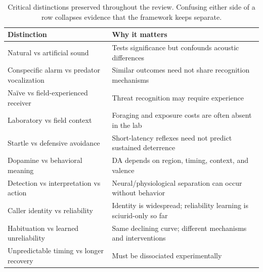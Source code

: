 \begin{table}[tbp]
\centering
\footnotesize
\singlespacing
\caption{Critical distinctions preserved throughout the review. Confusing either side of a row collapses evidence that the framework keeps separate.}
\label{tab:summary-distinctions}
\begin{tabular}{@{}p{2.0in}p{4.2in}@{}}
\toprule
\textbf{Distinction} & \textbf{Why it matters} \\
\midrule
Natural vs artificial sound & Tests significance but confounds acoustic differences \\
\addlinespace[2pt]
Conspecific alarm vs predator vocalization & Similar outcomes need not share recognition mechanisms \\
\addlinespace[2pt]
Na\"ive vs field-experienced receiver & Threat recognition may require experience \\
\addlinespace[2pt]
Laboratory vs field context & Foraging and exposure costs are often absent in the lab \\
\addlinespace[2pt]
Startle vs defensive avoidance & Short-latency reflexes need not predict sustained deterrence \\
\addlinespace[2pt]
Dopamine vs behavioral meaning & DA depends on region, timing, context, and valence \\
\addlinespace[2pt]
Detection vs interpretation vs action & Neural/physiological separation can occur without behavior \\
\addlinespace[2pt]
Caller identity vs reliability & Identity is widespread; reliability learning is sciurid-only so far \\
\addlinespace[2pt]
Habituation vs learned unreliability & Same declining curve; different mechanisms and interventions \\
\addlinespace[2pt]
Unpredictable timing vs longer recovery & Must be dissociated experimentally \\
\bottomrule
\end{tabular}
\end{table}
